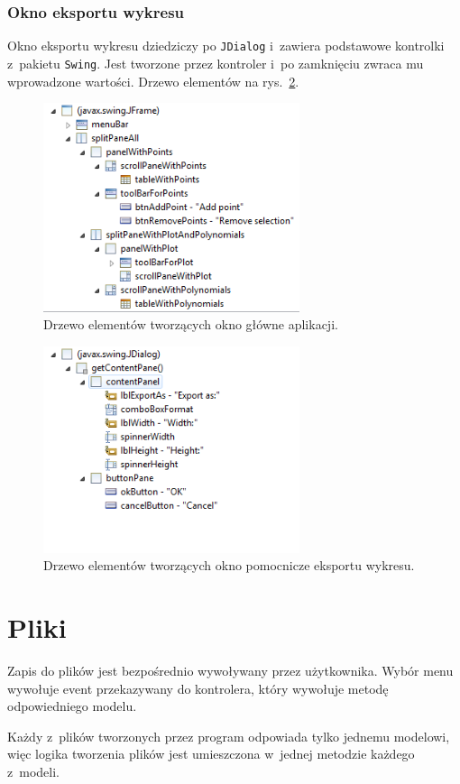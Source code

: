 \documentclass[10pt,a4paper]{article}
\newcommand{\f}[1]{\texttt{#1}}
\begin{document}
\subsubsection{Okno eksportu wykresu}

Okno eksportu wykresu dziedziczy po \f{JDialog} i~zawiera podstawowe kontrolki
z~pakietu \f{Swing}. Jest tworzone przez kontroler i~po zamknięciu zwraca mu
wprowadzone wartości. Drzewo elementów na rys.~\ref{fig:wykres-rysuj-widok}. 

\begin{figure}[p]
  \centering
  \includegraphics[width=0.67\textwidth]{figury/aplikacja-widok}
  \caption{Drzewo elementów tworzących okno główne aplikacji.}
  \label{fig:aplikacja-widok}
\end{figure}

\begin{figure}[p]
  \centering
  \includegraphics[width=0.67\textwidth]{figury/wykres-rysuj-widok}
  \caption{Drzewo elementów tworzących okno pomocnicze eksportu wykresu.}
  \label{fig:wykres-rysuj-widok}
\end{figure}

\section{Pliki}

Zapis do plików jest bezpośrednio wywoływany przez użytkownika. Wybór menu
wywołuje event przekazywany do kontrolera, który wywołuje metodę odpowiedniego
modelu.

Każdy z~plików tworzonych przez program odpowiada tylko jednemu modelowi, więc
logika tworzenia plików jest umieszczona w~jednej metodzie każdego z~modeli.
\end{document}
